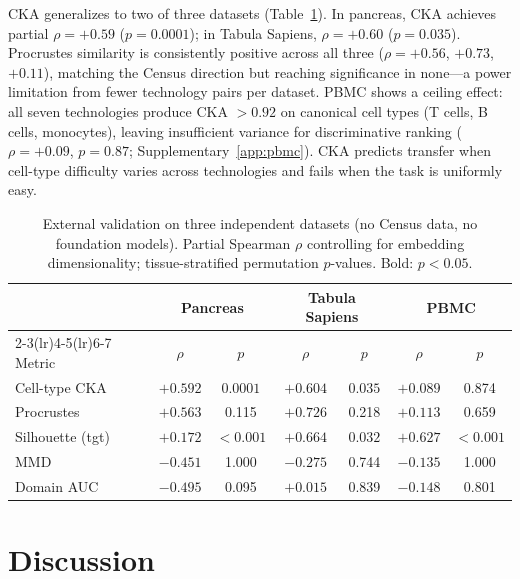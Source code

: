 \documentclass[11pt]{article}
\begin{document}
CKA generalizes to two of three datasets
(Table~\ref{tab:external}). In pancreas, CKA achieves partial
$\rho = +0.59$ ($p = 0.0001$); in Tabula Sapiens, $\rho = +0.60$
($p = 0.035$). Procrustes similarity is consistently positive across all
three ($\rho = +0.56$, $+0.73$, $+0.11$), matching the Census direction
but reaching significance in none---a power limitation from fewer
technology pairs per dataset. PBMC shows a ceiling effect: all seven
technologies produce CKA $> 0.92$ on canonical cell types (T cells, B
cells, monocytes), leaving insufficient variance for discriminative
ranking ($\rho = +0.09$, $p = 0.87$; Supplementary~\ref{app:pbmc}). CKA
predicts transfer when cell-type difficulty varies across technologies
and fails when the task is uniformly easy.

\begin{table}[t]
\centering
\caption{External validation on three independent datasets (no Census
data, no foundation models). Partial Spearman $\rho$ controlling for
embedding dimensionality; tissue-stratified permutation $p$-values.
Bold: $p < 0.05$.}
\label{tab:external}
\small
\begin{tabular}{@{}lcccccc@{}}
\toprule
& \multicolumn{2}{c}{Pancreas} & \multicolumn{2}{c}{Tabula Sapiens} & \multicolumn{2}{c}{PBMC} \\
\cmidrule(lr){2-3}\cmidrule(lr){4-5}\cmidrule(lr){6-7}
Metric & $\rho$ & $p$ & $\rho$ & $p$ & $\rho$ & $p$ \\
\midrule
Cell-type CKA & $+0.592$ & $\mathbf{0.0001}$ & $+0.604$ & $\mathbf{0.035}$ & $+0.089$ & 0.874 \\
Procrustes    & $+0.563$ & 0.115              & $+0.726$ & 0.218             & $+0.113$ & 0.659 \\
\midrule
Silhouette (tgt) & $+0.172$ & $\mathbf{<0.001}$ & $+0.664$ & $\mathbf{0.032}$ & $+0.627$ & $\mathbf{<0.001}$ \\
MMD              & $-0.451$ & 1.000              & $-0.275$ & 0.744             & $-0.135$ & 1.000 \\
Domain AUC       & $-0.495$ & 0.095              & $+0.015$ & 0.839             & $-0.148$ & 0.801 \\
\bottomrule
\end{tabular}
\end{table}


\section{Discussion}
\label{sec:discussion}
\end{document}
